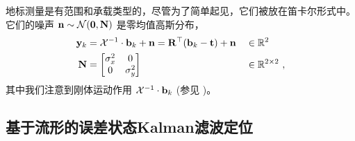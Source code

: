 %
地标测量是有范围和承载类型的，尽管为了简单起见，它们被放在笛卡尔形式中。
它们的噪声 ${\bf n}\sim\mathcal{N}({\bf0},{\bf N})$ 是零均值高斯分布，
%
\begin{align}\label{equ:meas_beacon}
{\bf y}_k &= \mathcal{X}^{-1}\cdot{\bf b}_k + {\bf n} = {\bf R}^{\top}({\bf b}_k-{\bf t}) + {\bf n}	&&\in {\mathbb R}^2
\\
{\bf N} &= \begin{bmatrix}
\sigma_x^2 &0 \\ 0& \sigma_y^2
\end{bmatrix}										&&\in{\mathbb R}^{2\times2}
~,
\end{align}
%
其中我们注意到刚体运动作用 $\mathcal{X}^{-1}\cdot{\bf b}_k$ (参见 )。




\subsection{基于流形的误差状态Kalman滤波定位}
\label{sec:loc_ESKF}

